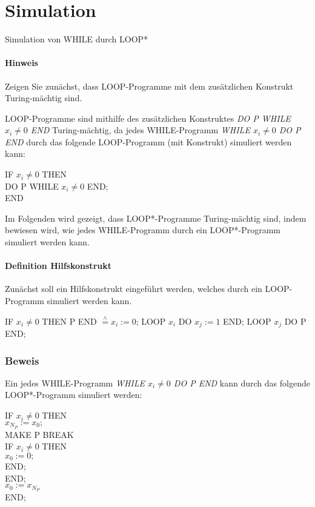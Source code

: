 \documentclass[10pt,leqno ]{article}
\newcommand{\estimates}{\overset{\scriptscriptstyle\wedge}{=}}
\begin{document}
\pagebreak

\section{Simulation}

Simulation von WHILE durch LOOP*

\paragraph{Hinweis}
Zeigen Sie zunächst, dass LOOP-Programme mit dem zusätzlichen Konstrukt
Turing-mächtig sind.
    
LOOP-Programme sind mithilfe des zusätzlichen Konstruktes \textit{DO P WHILE  $x_i \neq 0$ END} Turing-mächtig, da jedes WHILE-Programm \textit{WHILE $x_i \neq 0$ DO P END} durch das folgende LOOP-Programm (mit Konstrukt) simuliert werden kann:

\begin{flushleft}
IF $x_i \neq 0$ THEN \\ 
\quad    DO P WHILE $x_i \neq 0$ END; \\ 
END
\end{flushleft}

Im Folgenden wird gezeigt, dass LOOP*-Programme Turing-mächtig sind, indem bewiesen wird, wie jedes WHILE-Programm durch ein LOOP*-Programm simuliert werden kann.


\paragraph{Definition Hilfskonstrukt}
Zunächst soll ein Hilfskonstrukt eingeführt werden, welches durch ein LOOP-Programm simuliert werden kann.
\begin{flushleft}
    IF $x_i \neq 0$ THEN P END $\estimates x_i := 0$; LOOP $x_i$ DO $x_j := 1$ END; LOOP $x_j$ DO P END;
\end{flushleft}

\subsubsection*{Beweis}
Ein jedes WHILE-Programm \textit{WHILE $x_i \neq 0$ DO P END} kann durch das folgende LOOP*-Programm simuliert werden:

\begin{flushleft}
    IF $x_i \neq 0$ THEN \\ 
    \quad $x_{N_P} := x_0;$ \\ 
    \quad MAKE P  BREAK \\
    \qquad IF $x_i \neq 0$ THEN \\ 
    \quad \qquad $x_0 := 0;$ \\
    \qquad END; \\
    \quad END; \\ 
    \quad $x_0 := x_{N_P}$ \\
    END;
\end{flushleft}
\end{document}

